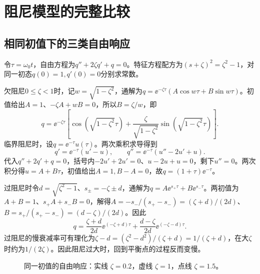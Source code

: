 \documentclass[11pt,openany,fontset=fandol]{ctexbook}
\theoremstyle{plain}\newtheorem{theorem}{定理}[chapter]\newtheorem{proposition}[theorem]{命题}
\theoremstyle{definition}\newtheorem{definition}{定义}[chapter]\newtheorem{example}{例}[chapter]
\theoremstyle{remark}\newtheorem*{remark}{说明}
\begin{document}
\section{阻尼模型的完整比较}
\subsection{相同初值下的三类自由响应}
令$\tau=\omega_0t$，自由方程为$q''+2\zeta q'+q=0$。特征方程配方为$(s+\zeta)^2=\zeta^2-1$，对同一初态$q(0)=1,q'(0)=0$分别求常数。

欠阻尼$0\le\zeta<1$时，记$w=\sqrt{1-\zeta^2}$，通解为$q=\ee^{-\zeta\tau}(A\cos w\tau+B\sin w\tau)$。初值给出$A=1$、$-\zeta A+wB=0$，所以$B=\zeta/w$，即
\[
q=\ee^{-\zeta\tau}\left[\cos(\sqrt{1-\zeta^2}\tau)+\frac{\zeta}{\sqrt{1-\zeta^2}}\sin(\sqrt{1-\zeta^2}\tau)\right].
\]
临界阻尼时，设$q=\ee^{-\tau}u(\tau)$。两次乘积求导得到
\[q'=\ee^{-\tau}(u'-u),\qquad q''=\ee^{-\tau}(u''-2u'+u).\]
代入$q''+2q'+q=0$，括号内$-2u'+2u'=0$、$u-2u+u=0$，剩下$u''=0$。两次积分得$u=A+B\tau$，初值给出$A=1,B-A=0$，故$q=(1+\tau)\ee^{-\tau}$。

过阻尼时令$d=\sqrt{\zeta^2-1}$、$s_\pm=-\zeta\pm d$，通解为$q=A\ee^{s_+\tau}+B\ee^{s_-\tau}$。两初值为$A+B=1$、$s_+A+s_-B=0$，解得$A=-s_-/(s_+-s_-)=(\zeta+d)/(2d)$、$B=s_+/(s_+-s_-)=(d-\zeta)/(2d)$。因此
\[
q=\frac{\zeta+d}{2d}\ee^{(-\zeta+d)\tau}+\frac{d-\zeta}{2d}\ee^{(-\zeta-d)\tau}.
\]
过阻尼的慢衰减率可有理化为$\zeta-d=(\zeta^2-d^2)/(\zeta+d)=1/(\zeta+d)$，在大$\zeta$时约为$1/(2\zeta)$。因此阻尼过大时，回到平衡点的过程反而变慢。
\begin{figure}[htbp]\centering
{}
\caption{同一初值的自由响应：实线 $\zeta=0.2$，虚线 $\zeta=1$，点线 $\zeta=1.5$。}
\label{fig:orig-005}
\end{figure}
\end{document}

